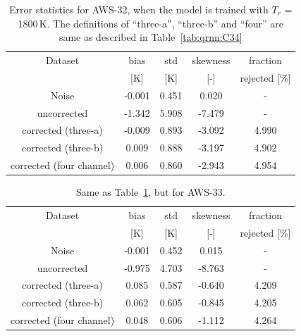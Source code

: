 \documentclass[12pt]{article}
\begin{document}
\begin{table}[!p]
	\centering
	\begin{tabular}[b]{c|c|c|c|c}
		Dataset  		  &   bias &   std &   skewness & fraction  \\
		&   [K]  &   [K] & [-] & rejected [\%]\\
		\hline
	Noise                      & -0.001 & 0.451 &              0.020 &      - \\
	uncorrected                & -1.342 & 5.908 &             -7.479 &      - \\
	corrected (three-a) 	   & -0.009 & 0.893 &             -3.092 &      4.990 \\
    corrected (three-b) 	   &  0.009 & 0.888 &             -3.197 &      4.902 \\	
	corrected (four channel)   &  0.006 & 0.860 &             -2.943 &      4.954 \\
		\hline
	\end{tabular}
	\caption{Error statistics for AWS-32, when the model is trained with $T_r$ = 1800\,K. The definitions of ``three-a'', ``three-b'' and ``four'' are same as described in Table~\ref{tab:qrnn:C34} }
	\label{tab:qrnn:C32:Trec:1800}
\end{table}

\begin{table}[!p]
	\centering
	\begin{tabular}[b]{c|c|c|c|c}
		Dataset  		  &   bias &   std &   skewness & fraction  \\
		&   [K]  &   [K] & [-] & rejected [\%]\\
		\hline
	Noise                       & -0.001 & 0.452 &              0.015 &      - \\
	uncorrected                 & -0.975 & 4.703 &             -8.763 &      - \\
	corrected (three-a) 		&  0.085 & 0.587 &             -0.640 &      4.209 \\
	corrected (three-b) 		&  0.062 & 0.605 &             -0.845 &      4.205 \\
	corrected (four channel)    &  0.048 & 0.606 &             -1.112 &      4.264 \\
		\hline
	\end{tabular}
	\caption{ Same as Table~\ref{tab:qrnn:C32:Trec:1800}, but for AWS-33.}
	\label{tab:qrnn:C33:Trec:1800}
\end{table}
\end{document}
